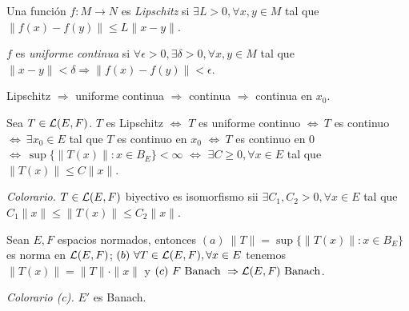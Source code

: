\begin{definition}
    Una función \(f:M\to N \) es \emph{Lipschitz} si \(\exists L>0, \forall x,y\in M\) tal que \(\|f(x)- f(y)\|\leq L \|x-y\|\).  
\end{definition}
\begin{definition}
    \(f\) es \emph{uniforme continua} si \(\forall \epsilon >0,\exists \delta >0,\forall x,y\in M\) tal que \(\|x-y\|<\delta \Rightarrow \|f(x)-f(y)\|<\epsilon\). 
\end{definition}
\begin{note}
    Lipschitz \(\Rightarrow\) uniforme continua \(\Rightarrow\) continua \(\Rightarrow\) continua en \(x_0\). 
\end{note}
\begin{theorem}
    Sea \(T\in \mathcal{L}(E,F)\). \(T\) es Lipschitz \(\Leftrightarrow\) \(T\) es uniforme continuo \(\Leftrightarrow\ T\) es continuo \(\Leftrightarrow\ \exists x_0\in E\) tal que \(T\) es continuo en \(x_0\) \(\Leftrightarrow\ T\) es continuo en \(0\)  \(\Leftrightarrow\ \sup\{\|T(x)\| : x\in B_E\}<\infty\) \(\Leftrightarrow \) \(\exists C\geq 0, \forall x\in E\) tal que \(\|T(x)\|\leq C \|x\|\). 
\end{theorem}
\begin{note}
    \emph{Colorario.} \(T\in \mathcal{L}(E,F)\) biyectivo es isomorfismo sii \(\exists C_1,C_2>0, \forall x\in E\) tal que \(C_1\|x\|\leq \|T(x)\| \leq C_2 \|x\|\). 
\end{note}
\begin{proposition}
    Sean \(E,F\) espacios normados, entonces \((a) \ \|T\| = \sup\{\|T(x)\|: x\in B_E\}\) es norma en \(\mathcal{L}(E,F)\); \((b) \ \forall T\in \mathcal{L}(E,F),\forall x\in E \) tenemos \( \|T(x)\| = \|T\|\cdot\|x\|\) y \((c) \ F\text{ Banach } \Rightarrow \mathcal{L}(E,F) \text{ Banach}\). 
\end{proposition}
\begin{note}
    \emph{Colorario (c).} \(E'\) es Banach. 
\end{note}

\E 

